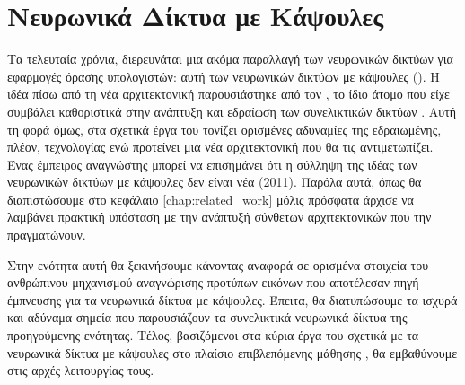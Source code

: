\section{Νευρωνικά Δίκτυα με Κάψουλες}
\label{sec:capsule_theory}
Τα τελευταία χρόνια, διερευνάται μια ακόμα παραλλαγή των νευρωνικών δικτύων για εφαρμογές όρασης υπολογιστών: αυτή των νευρωνικών δικτύων με κάψουλες (). Η ιδέα πίσω από τη νέα αρχιτεκτονική παρουσιάστηκε από τον , το ίδιο άτομο που είχε συμβάλει καθοριστικά στην ανάπτυξη και εδραίωση των συνελικτικών δικτύων \cite{krizhevsky2012imagenet}. Αυτή τη φορά όμως, στα σχετικά έργα του \cite{hinton2011transforming, sabour2017dynamic, hinton2018matrix} τονίζει ορισμένες αδυναμίες της εδραιωμένης, πλέον, τεχνολογίας ενώ προτείνει μια νέα αρχιτεκτονική που θα τις αντιμετωπίζει. Ένας έμπειρος αναγνώστης μπορεί να επισημάνει ότι η σύλληψη της ιδέας των νευρωνικών δικτύων με κάψουλες δεν είναι νέα (2011). Παρόλα αυτά, όπως θα διαπιστώσουμε στο κεφάλαιο \ref{chap:related_work} μόλις πρόσφατα άρχισε να λαμβάνει πρακτική υπόσταση με την ανάπτυξή σύνθετων αρχιτεκτονικών που την πραγματώνουν.\par

Στην ενότητα αυτή θα ξεκινήσουμε κάνοντας αναφορά σε ορισμένα στοιχεία του ανθρώπινου μηχανισμού αναγνώρισης προτύπων εικόνων που αποτέλεσαν πηγή έμπνευσης για τα νευρωνικά δίκτυα με κάψουλες. Έπειτα, θα διατυπώσουμε τα ισχυρά και αδύναμα σημεία που παρουσιάζουν τα συνελικτικά νευρωνικά δίκτυα της προηγούμενης ενότητας. Τέλος, βασιζόμενοι στα κύρια έργα του  σχετικά με τα νευρωνικά δίκτυα με κάψουλες στο πλαίσιο επιβλεπόμενης μάθησης \cite{hinton2011transforming, sabour2017dynamic, hinton2018matrix}, θα εμβαθύνουμε στις αρχές λειτουργίας τους.\par

